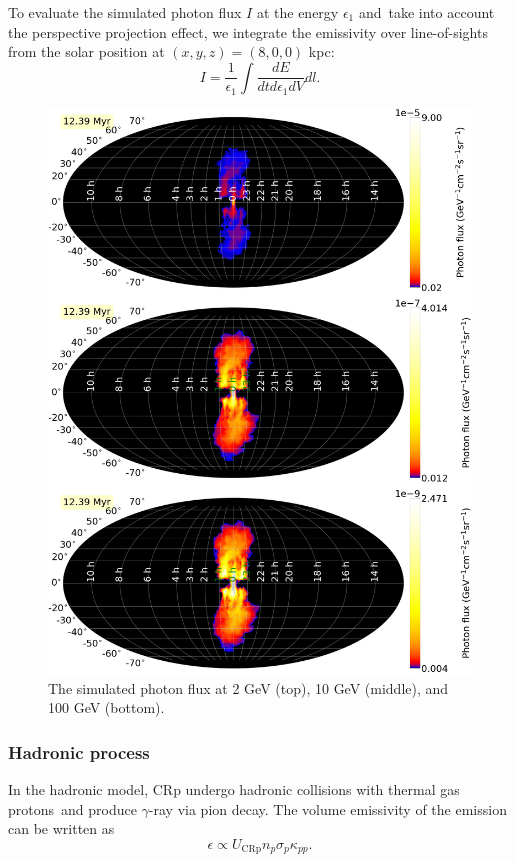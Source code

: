 \documentclass[twocolumn]{aastex631}
\begin{document}
To evaluate the simulated photon flux $I$ at the energy $\epsilon_{1}$ and\
take into account the perspective projection effect,
we integrate the emissivity over line-of-sights from the solar position at $(x,y,z)=(8,0,0)$ kpc:
\begin{equation}
I = \frac{1}{\epsilon_{1}}\int \frac{dE}{dtd\epsilon_{1}dV} dl.
\end{equation}


\begin{figure}
  \includegraphics[width=\linewidth]{figures/fig__gammaRay.png}
  \caption{The simulated photon flux at  2 GeV (top), 10 GeV (middle), and 100 GeV (bottom).}
  \label{fig__gammaRay}
\end{figure}


\subsubsection{Hadronic process}
In the hadronic model, CRp undergo hadronic collisions with thermal gas protons\
and produce $\gamma$-ray via pion decay. The volume emissivity of the emission can be written as
\begin{equation}
   \epsilon \propto U_{\text{CRp}}n_{p}\sigma_{p}\kappa_{pp}.
\end{equation}
\end{document}
